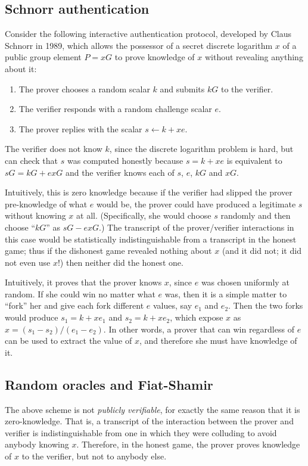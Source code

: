 \documentclass[letterpaper]{article}
\begin{document}
\subsection{Schnorr authentication}
Consider the following interactive authentication protocol, developed by Claus
Schnorr in 1989\cite{schnorr1989}, which allows the possessor of a secret discrete
logarithm $x$ of a public group element $P=xG$ to prove knowledge of $x$ without
revealing anything about it:
\begin{enumerate}
\item The prover chooses a random scalar $k$ and submits $kG$ to the verifier.
\item The verifier responds with a random challenge scalar $e$.
\item The prover replies with the scalar $s\gets k + xe$.
\end{enumerate}
The verifier does not know $k$, since the discrete logarithm problem is hard,
but can check that $s$ was computed honestly because $s = k + xe$ is equivalent
to $sG = kG + exG$ and the verifier knows each of $s$, $e$, $kG$ and $xG$.

Intuitively, this is zero knowledge because if the verifier had slipped the
prover pre-knowledge of what $e$ would be, the prover could have produced a
legitimate $s$ without knowing $x$ at all. (Specifically, she would choose
$s$ randomly and then choose ``$kG$'' as $sG - exG$.) The transcript of the
prover/verifier interactions in this case would be statistically indistinguishable
from a transcript in the honest game; thus if the dishonest game revealed
nothing about $x$ (and it did not; it did not even use $x$!) then neither did
the honest one.

Intuitively, it proves that the prover knows $x$, since $e$ was chosen uniformly
at random. If she could win no matter what $e$ was, then it is a simple matter to
``fork'' her and give each fork different $e$ values, say $e_1$ and $e_2$. Then
the two forks would produce $s_1 = k + xe_1$ and $s_2 = k + xe_2$, which expose
$x$ as $x = (s_1 - s_2)/(e_1 - e_2)$. In other words, a prover that can win
regardless of $e$ can be used to extract the value of $x$, and therefore she must
have knowledge of it.

\subsection{Random oracles and Fiat-Shamir}

The above scheme is not \emph{publicly verifiable}, for exactly the same reason
that it is zero-knowledge. That is, a transcript of the interaction between the
prover and verifier is indistinguishable from one in which they were colluding
to avoid anybody knowing $x$. Therefore, in the honest game, the prover proves
knowledge of $x$ to the verifier, but not to anybody else.
\end{document}
